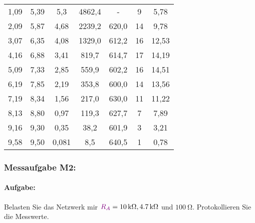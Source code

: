 \documentclass[11pt,a4paper,titlepage]{scrreprt}
\begin{document}
\begin{center}
\begin{table}[!hbtp]
\begin{center}
\begin{tabular}{ccccccc}
                                1,09 & 5,39 & 5,3 & 4862,4 & - & 9 & 5,78\\
                                2,09 & 5,87 & 4,68 & 2239,2 & 620,0 & 14 & 9,78\\
                                3,07 & 6,35 & 4,08 & 1329,0 & 612,2 & 16 & 12,53\\
                                4,16 & 6,88 & 3,41 & 819,7 & 614,7 & 17 & 14,19\\
                                5,09 & 7,33 & 2,85 & 559,9 & 602,2 & 16 & 14,51\\
                                6,19 & 7,85 & 2,19 & 353,8 & 600,0 & 14 & 13,56\\
                                7,19 & 8,34 & 1,56 & 217,0 & 630,0 & 11 & 11,22\\
                                8,13 & 8,80 & 0,97 & 119,3 & 627,7 & 7 & 7,89\\
                                9,16 & 9,30 & 0,35 & 38,2 & 601,9 & 3 & 3,21\\
                                9,58 & 9,50 & 0,081 & 8,5 & 640,5 & 1 & 0,78\\
                            \end{tabular}
                        \end{center}
                    \end{table}
                \end{center}
           \subsubsection{Messaufgabe M2:}
               \paragraph{Aufgabe:}Belasten Sie das Netzwerk mir $\textcolor{violet}{R_A} = \SI{10}{\kilo\ohm}, \SI{4,7}{\kilo\ohm}$ und $\SI{100}{\ohm}$.
               Protokollieren Sie die Messwerte.
\end{document}
